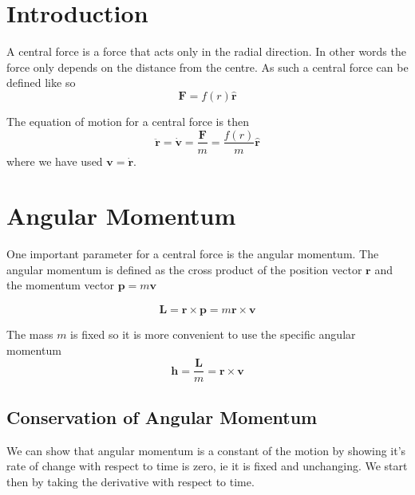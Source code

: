 \section{Introduction}
A central force is a force that acts only in the radial direction. In other words the force only depends on the distance from the centre. As such a central force can be defined like so
\begin{equation}
\mathbf{F} = f(r) \hat{\mathbf{r}} \label{eq:central1}
\end{equation}

The equation of motion for a central force is then
\begin{equation}
\ddot{\mathbf{r}} = \dot{\mathbf{v}}= \frac{\mathbf{F}}{m}= \frac{f(r)}{m} \hat{\mathbf{r}} \label{eq:central2}
\end{equation}
where we have used $\mathbf{v}=\dot{\mathbf{r}}$.

\section{Angular Momentum}

One important parameter for a central force is the angular momentum. The angular momentum is defined as the cross product of the position vector $\mathbf{r}$ and the momentum vector $\mathbf{p}=m\mathbf{v}$

\begin{equation}
\mathbf{L}=\mathbf{r}\times\mathbf{p} = m \mathbf{r}\times\mathbf{v}
\end{equation}

The mass $m$ is fixed so it is more convenient to use the specific angular momentum
\begin{equation}
\mathbf{h}=\frac{\mathbf{L}}{m}= \mathbf{r}\times\mathbf{v} \label{eq:central-angular-momentum}
\end{equation}

\subsection{Conservation of Angular Momentum}

We can show that angular momentum is a constant of the motion by showing it's rate of change with respect to time is zero, ie it is fixed and unchanging. We start then by taking the derivative with respect to time.

